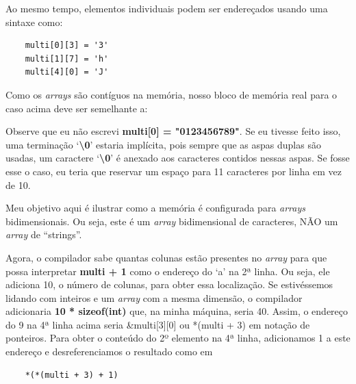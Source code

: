 Ao mesmo tempo, elementos individuais podem ser endereçados usando uma sintaxe como:
\begin{lstlisting}
	multi[0][3] = '3'
	multi[1][7] = 'h'
	multi[4][0] = 'J'
\end{lstlisting}

Como os \textit{arrays} são contíguos na memória, nosso bloco de memória real para o caso acima deve ser semelhante a:

\vspace{1em}
\ifx\du\undefined
\newlength{\du}
\fi
\setlength{\du}{15\unitlength}

Observe que eu não escrevi \textbf{multi[0] = "0123456789"}. Se eu tivesse feito isso, uma terminação `\textbf{\textbackslash0}' estaria implícita, pois sempre que as aspas duplas são usadas, um caractere `\textbf{\textbackslash0}' é anexado aos caracteres contidos nessas aspas. Se fosse esse o caso, eu teria que reservar um espaço para 11 caracteres por linha em vez de 10.

Meu objetivo aqui é ilustrar como a memória é configurada para \textit{arrays} bidimensionais. Ou seja, este é um \textit{array} bidimensional de caracteres, NÃO um \textit{array} de ``strings''.

Agora, o compilador sabe quantas colunas estão presentes no \textit{array} para que possa interpretar \textbf{multi + 1} como o endereço do `a' na 2ª linha. Ou seja, ele adiciona 10, o número de colunas, para obter essa localização. Se estivéssemos lidando com inteiros e um \textit{array} com a mesma dimensão, o compilador adicionaria \textbf{10 * sizeof(int)} que, na minha máquina, seria 40.
Assim, o endereço do 9 na 4ª linha acima seria \&multi[3][0] ou *(multi + 3) em notação de ponteiros. Para obter o conteúdo do 2º elemento na 4ª linha, adicionamos 1 a este endereço e desreferenciamos o resultado como em
\begin{lstlisting}
	*(*(multi + 3) + 1)
\end{lstlisting}

